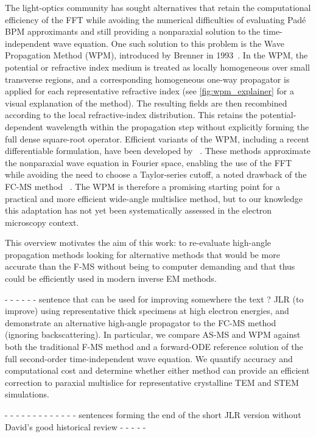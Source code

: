 \documentclass[preprint,12pt,number]{elsarticle}
\begin{document}
The light-optics community has sought alternatives that retain the
computational efficiency of the FFT while avoiding the numerical difficulties
of evaluating Pad\'e BPM approximants and still providing a nonparaxial solution
to the time-independent wave equation. One such solution to this problem is the Wave Propagation
Method (WPM), introduced by Brenner in 1993~\cite{Brenner1993}. In the WPM, the
potential or refractive index medium is treated as locally homogeneous over small transverse regions, and a
corresponding homogeneous one-way propagator is applied for each representative
refractive index (see \ref{fig:wpm_explainer} for a visual explanation of the method). 
The resulting fields are then recombined according to the
local refractive-index distribution. This retains the potential-dependent
wavelength within the propagation step without explicitly forming the full
dense square-root operator. Efficient variants of the WPM, including a recent
differentiable formulation, have been developed by ~\cite{Schmidt2016,BarreBrunel2025}.
These methods approximate the nonparaxial wave
equation in Fourier space, enabling the use of the FFT while avoiding the need
to choose a Taylor-series cutoff, a noted drawback of the FC-MS method
~\cite{2025ChenDyckPaper}. The WPM is therefore a promising starting point for a
practical and more efficient wide-angle multislice method, but to our knowledge this adaptation has
not yet been systematically assessed in the electron microscopy context.

This overview motivates the aim of this work: to re-evaluate high-angle propagation methods
looking for alternative methods that would be more accurate than the F-MS without being to computer demanding and that thus could be efficiently used in modern inverse  EM methods. 

- - - - - - sentence that can be used for improving somewhere the text ? JLR 
(to improve) 
using representative thick specimens at high electron energies, and demonstrate an alternative
high-angle propagator to the FC-MS method (ignoring backscattering). In particular, we
compare AS-MS and WPM against both the traditional F-MS method and a forward-ODE
reference solution of the full second-order time-independent wave equation. We
quantify accuracy and computational cost and determine whether either method
can provide an efficient correction to paraxial multislice for representative
crystalline TEM and STEM simulations.

- - - - - - - - - - - - - sentences forming the end of the short JLR version without David's  good historical review  - - - - -
\end{document}
